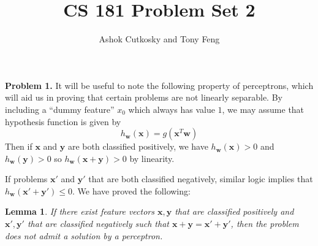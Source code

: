 \documentclass[12pt]{amsart}
\title{CS 181 Problem Set 2}
\author{Ashok Cutkosky and Tony Feng}
\newcommand{\mbf}[1]{\mathbf{#1}}
\newtheorem{lemma}[thm]{Lemma}
\theoremstyle{remark}
\begin{document}
\maketitle

\noindent \textbf{Problem 1.} It will be useful to note the following property of perceptrons, which will aid us in proving that certain problems are not linearly separable. By including a ``dummy feature'' $x_0$ which always has value $1$, we may assume that hypothesis function is given by 
\[
h_{\mbf{w}}(\mbf{x}) = g(\mbf{x}^T \mbf{w})
\]
Then if $\mbf{x}$ and $\mbf{y}$ are both classified positively, we have $h_{\mbf{w}}(\mbf{x}) >0 $ and $h_{\mbf{w}}(\mbf{y}) > 0$ so $h_{\mbf{w}}(\mbf{x}+\mbf{y}) > 0$ by linearity. 

If problems $\mbf{x}'$ and $\mbf{y}'$ that are both classified negatively, similar logic implies that $h_{\mbf{w}}(\mbf{x}'+\mbf{y}') \leq 0$. We have proved the following: 

\begin{lemma}\label{no_perceptron}
If there exist feature vectors $\mbf{x}, \mbf{y}$ that are classified positively and $\mbf{x}', \mbf{y}'$ that are classified negatively such that $\mbf{x} + \mbf{y} = \mbf{x}' + \mbf{y}'$, then the problem does not admit a solution by a perceptron. 
\end{lemma}
\end{document}
